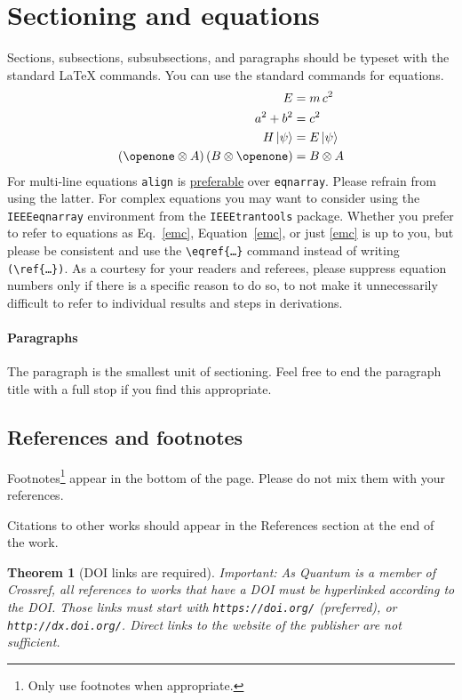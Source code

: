 \documentclass[a4paper,twocolumn,11pt,accepted=2017-05-09]{quantumarticle}
\newtheorem{theorem}{Theorem}
\begin{document}
\section{Sectioning and equations}
Sections, subsections, subsubsections, and paragraphs should be typeset with the standard LaTeX commands.
You can use the standard commands for equations.
\begin{align}
  \label{emc}
  E &= m\,c^2\\
  a^2 + b^2 &= c^2\\
  H\,|\psi\rangle &= E\,|\psi\rangle\\
  (\openone \otimes A)\,(B \otimes \openone) &= B \otimes A
\end{align}
For multi-line equations \texttt{align} is \href{http://tex.stackexchange.com/questions/196/eqnarray-vs-align}{preferable} over \texttt{eqnarray}.
Please refrain from using the latter.
For complex equations you may want to consider using the \texttt{IEEEeqnarray} environment from the \texttt{IEEEtrantools} package.
Whether you prefer to refer to equations as Eq.~\eqref{emc}, Equation~\ref{emc}, or just \eqref{emc} is up to you, but please be consistent and use the \texttt{\textbackslash{}eqref\{\dots\}} command instead of writing \texttt{(\textbackslash{}ref\{\dots\})}.
As a courtesy for your readers and referees, please suppress equation numbers only if there is a specific reason to do so, to not make it unnecessarily difficult to refer to individual results and steps in derivations.

\paragraph{Paragraphs}
The paragraph is the smallest unit of sectioning.
Feel free to end the paragraph title with a full stop if you find this appropriate.

\subsection{References and footnotes}
\label{sec:subsec1}
Footnotes\footnote{Only use footnotes when appropriate.} appear in the bottom of the page.
Please do not mix them with your references.

Citations to other works should appear in the References section at the end of the work.

\begin{theorem}[DOI links are required]
  Important: As Quantum is a member of Crossref, all references to works that have a DOI must be hyperlinked according to the DOI. Those links must start with \texttt{https://doi.org/} (preferred), or \texttt{http://dx.doi.org/}. Direct links to the website of the publisher are not sufficient.
\end{theorem}
\end{document}
